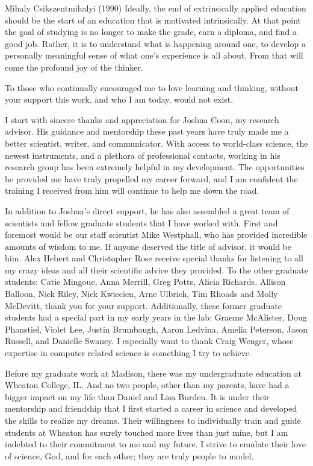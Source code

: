 \begin{wbepi}{Mihaly Csikszentmihalyi (1990)}
Ideally, the end of extrinsically applied education should be the start of an education that is motivated intrinsically. At that point the goal of studying is no longer to make the grade, earn a diploma, and find a good job. Rather, it is to understand what is happening around one, to develop a personally meaningful sense of what one's experience is all about. From that will come the profound joy of the thinker.
\end{wbepi}

To those who continually encouraged me to love learning and thinking, without your support this work, and who I am today, would not exist.

I start with sincere thanks and appreciation for Joshua Coon, my research advisor. His guidance and mentorship these past years have truly made me a better scientist, writer, and communicator. With access to world-class science, the newest instruments, and a plethora of professional contacts, working in his research group has been extremely helpful in my development. The opportunities he provided me have truly propelled my career forward, and I am confident the training I received from him will continue to help me down the road.

In addition to Joshua's direct support, he has also assembled a great team of scientists and fellow graduate students that I have worked with. First and foremost would be our staff scientist Mike Westphall, who has provided incredible amounts of wisdom to me. If anyone deserved the title of advisor, it would be him. Alex Hebert and Christopher Rose receive special thanks for listening to all my crazy ideas and all their scientific advice they provided. To the other graduate students: Catie Mingoue, Anna Merrill, Greg Potts, Alicia Richards, Allison Balloon, Nick Riley, Nick Kwiecien, Arne Ulbrich, Tim Rhoads and Molly McDevitt, thank you for your support. Additionally, these former graduate students had a special part in my early years in the lab: Graeme McAlister, Doug Phanstiel, Violet Lee, Justin Brumbaugh, Aaron Ledvina, Amelia Peterson, Jason Russell, and Danielle Swaney. I especially want to thank Craig Wenger, whose expertise in computer related science is something I try to achieve.

Before my graduate work at Madison, there was my undergraduate education at Wheaton College, IL. And no two people, other than my parents, have had a bigger impact on my life than Daniel and Lisa Burden. It is under their mentorship and friendship that I first started a career in science and developed the skills to realize my dreams. Their willingness to individually train and guide students at Wheaton has surely touched more lives than just mine, but I am indebted to their commitment to me and my future. I strive to emulate their love of science, God, and for each other; they are truly people to model.

